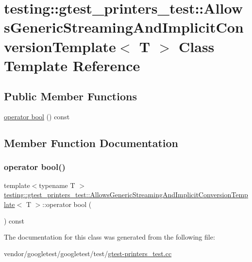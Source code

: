 \hypertarget{classtesting_1_1gtest__printers__test_1_1_allows_generic_streaming_and_implicit_conversion_template}{}\section{testing\+:\+:gtest\+\_\+printers\+\_\+test\+:\+:Allows\+Generic\+Streaming\+And\+Implicit\+Conversion\+Template$<$ T $>$ Class Template Reference}
\label{classtesting_1_1gtest__printers__test_1_1_allows_generic_streaming_and_implicit_conversion_template}
\subsection*{Public Member Functions}
\begin{DoxyCompactItemize}
\item 
\hyperlink{classtesting_1_1gtest__printers__test_1_1_allows_generic_streaming_and_implicit_conversion_template_af5f8ea44d7d86283b4c004a994ddd7f9}{operator bool} () const
\end{DoxyCompactItemize}


\subsection{Member Function Documentation}
\mbox{\label{classtesting_1_1gtest__printers__test_1_1_allows_generic_streaming_and_implicit_conversion_template_af5f8ea44d7d86283b4c004a994ddd7f9}} 
\subsubsection{\texorpdfstring{operator bool()}{operator bool()}}
{\footnotesize\ttfamily template$<$typename T $>$ \\
\hyperlink{classtesting_1_1gtest__printers__test_1_1_allows_generic_streaming_and_implicit_conversion_template}{testing\+::gtest\+\_\+printers\+\_\+test\+::\+Allows\+Generic\+Streaming\+And\+Implicit\+Conversion\+Template}$<$ T $>$\+::operator bool (\begin{DoxyParamCaption}{ }\end{DoxyParamCaption}) const\hspace{0.3cm}{\ttfamily [inline]}}



The documentation for this class was generated from the following file\+:\begin{DoxyCompactItemize}
\item 
vendor/googletest/googletest/test/\hyperlink{gtest-printers__test_8cc}{gtest-\/printers\+\_\+test.\+cc}\end{DoxyCompactItemize}
